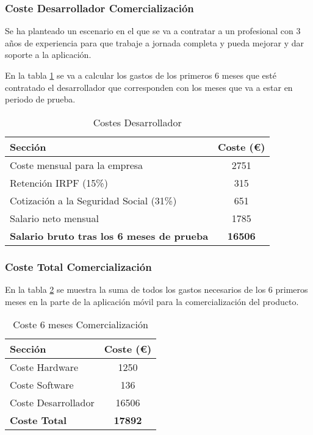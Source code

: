 \subsubsection{Coste Desarrollador Comercialización}
Se ha planteado un escenario en el que se va a contratar a un profesional con 3 años de experiencia para que trabaje a jornada completa y pueda mejorar y dar soporte a la aplicación.

En la tabla \ref{tab:CostosPersonalCom} se va a calcular los gastos de los primeros 6 meses que esté contratado el desarrollador que corresponden con los meses que va a estar en periodo de prueba.

\begin{table}[H]
\centering
\begin{tabular}{|l|c|}
\hline
\textbf{Sección} & \textbf{Coste (€)} \\ \hline
Coste mensual para la empresa & 2751 \\ \hline
Retención IRPF (15\%) & 315  \\ \hline
Cotización a la Seguridad Social (31\%) & 651 \\ \hline
Salario neto mensual & 1785 \\ \hline
\textbf{Salario bruto tras los 6 meses de prueba} & \textbf{16506} \\ \hline
\end{tabular}
\caption{Costes Desarrollador}
\label{tab:CostosPersonalCom}
\end{table}


\subsubsection{Coste Total Comercialización}

En la tabla \ref{tab:CosteTotalCom} se muestra la suma de todos los gastos necesarios de los 6 primeros meses en la parte de la aplicación móvil para la comercialización del producto.

\begin{table}[H]
\centering
\begin{tabular}{|l|c|}
\hline
\textbf{Sección} & \textbf{Coste (€)} \\ \hline
Coste Hardware & 1250 \\ \hline
Coste Software & 136 \\ \hline
Coste Desarrollador & 16506 \\ \hline
\textbf{Coste Total} & \textbf{17892} \\ \hline
\end{tabular}
\caption{Coste 6 meses Comercialización}
\label{tab:CosteTotalCom}
\end{table}


